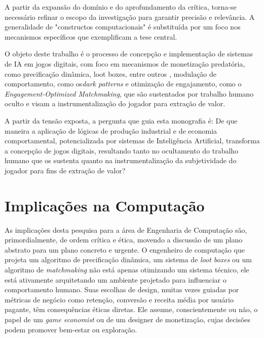 A partir da expansão do domínio e do aprofundamento da crítica, torna-se necessário refinar o escopo da investigação para garantir 
precisão e relevância. A generalidade de "constructos computacionais" é substituída por um foco nos mecanismos específicos que 
exemplificam a tese central.

O objeto deste trabalho é o processo de concepção e implementação de sistemas de IA em jogos digitais, com foco em mecanismos de 
monetização predatória, como precificação dinâmica, loot boxes, entre outros \cite{PetrovskayaZendle2022}, modulação de comportamento, como os\textit{dark patterns} \cite{Brignull2023Deceptive}
e otimização de engajamento, como o \textit{Engagement-Optimized Matchmaking}, que são sustentados por trabalho humano oculto e visam 
a instrumentalização do jogador para extração de valor.

A partir da tensão exposta, a pergunta que guia esta monografia é: De que maneira a aplicação de lógicas de produção industrial e de 
economia comportamental, potencializada por sistemas de Inteligência Artificial, transforma a concepção de jogos digitais, resultando 
tanto no ocultamento do trabalho humano que os sustenta quanto na instrumentalização da subjetividade do jogador para fins de 
extração de valor?

\section{Implicações na Computação}\label{sec:implicacoes_computacao}

As implicações desta pesquisa para a área de Engenharia de Computação são, primordialmente, de ordem crítica e ética, movendo a 
discussão de um plano abstrato para um plano concreto e urgente. O engenheiro de computação que projeta um algoritmo de precificação 
dinâmica, um sistema de \textit{loot boxes} ou um algoritmo de \textit{matchmaking} não está apenas otimizando um sistema técnico, 
ele está ativamente arquitetando um ambiente projetado para influenciar o comportamento humano. Suas escolhas de design, muitas vezes 
guiadas por métricas de negócio como retenção, conversão e receita média por usuário pagante, têm consequências éticas diretas. Ele 
assume, conscientemente ou não, o papel de um \textit{game economist} ou de um designer de monetização, cujas decisões podem promover 
bem-estar ou exploração. 

